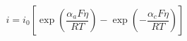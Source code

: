 \documentclass[preview]{standalone}
\begin{document}
\[i = i_0 \left[\exp\left(\frac{\alpha_a F \eta}{RT}\right) - \exp\left(-\frac{\alpha_c F \eta}{RT}\right)\right] \tag{2.12}\]
\end{document}
